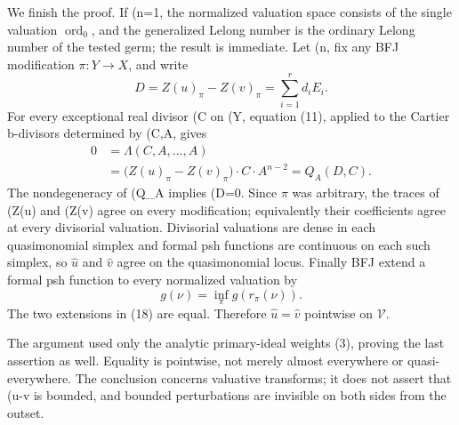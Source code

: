 We finish the proof.  If (n=1\), the normalized valuation space consists
of the single valuation \(\operatorname{ord}_0\), and the generalized
Lelong number is the ordinary Lelong number of the tested germ; the result
is immediate.  Let (n\), fix any BFJ modification \(\pi:Y\to X\), and
write
\[
 D=Z(u)_\pi-Z(v)_\pi=\sum_{i=1}^r d_iE_i.
\tag{16}
\]
For every exceptional real divisor (C\) on (Y\), equation (11), applied
to the Cartier b-divisors determined by (C,A\), gives
\[
 \begin{aligned}
 0&=\Lambda(C,A,\ldots,A)\\
  &=\bigl(Z(u)_\pi-Z(v)_\pi\bigr)\cdot C\cdot A^{n-2}
   =Q_A(D,C).
 \end{aligned}
\tag{17}
\]
The nondegeneracy of (Q_A\) implies (D=0\).  Since \(\pi\) was arbitrary,
the traces of (Z(u)\) and (Z(v)\) agree on every modification; equivalently
their coefficients agree at every divisorial valuation.  Divisorial
valuations are dense in each quasimonomial simplex and formal psh functions
are continuous on each such simplex, so \(\widehat u\) and \(\widehat v\)
agree on the quasimonomial locus.  Finally BFJ extend a formal psh function
to every normalized valuation by
\[
                          g(\nu)=\inf_\pi g(r_\pi(\nu)).
\tag{18}
\]
The two extensions in (18) are equal.  Therefore
\(\widehat u=\widehat v\) pointwise on \(\mathcal V\).

The argument used only the analytic primary-ideal weights (3), proving the
last assertion as well.  Equality is pointwise, not merely almost everywhere
or quasi-everywhere.  The conclusion concerns valuative transforms; it does
not assert that (u-v\) is bounded, and bounded perturbations are invisible
on both sides from the outset.
